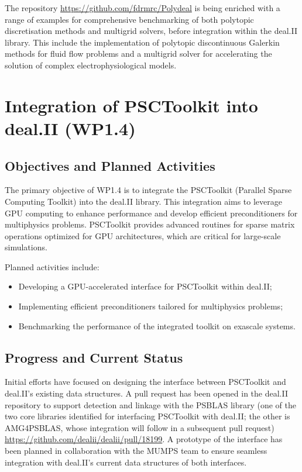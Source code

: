 \documentclass[a4paper,12pt]{article}
\begin{document}
The repository \url{https://github.com/fdrmrc/Polydeal} is being enriched with a range of examples for comprehensive benchmarking of both polytopic discretisation methods and multigrid solvers, before integration within the deal.II library. This include the implementation of polytopic discontinuous Galerkin methods for fluid flow problems and a multigrid solver for accelerating the solution of complex electrophysiological models.

\section{Integration of PSCToolkit into deal.II (WP1.4)}
    \subsection{Objectives and Planned Activities}
        The primary objective of WP1.4 is to integrate the PSCToolkit (Parallel Sparse Computing Toolkit) into the deal.II library. This integration aims to leverage GPU computing to enhance performance and develop efficient preconditioners for multiphysics problems. PSCToolkit provides advanced routines for sparse matrix operations optimized for GPU architectures, which are critical for large-scale simulations.

        Planned activities include:
        \begin{itemize}
            \item Developing a GPU-accelerated interface for PSCToolkit within deal.II;
            \item Implementing efficient preconditioners tailored for multiphysics problems;
            \item Benchmarking the performance of the integrated toolkit on exascale systems.
        \end{itemize}

        \subsection{Progress and Current Status}
        Initial efforts have focused on designing the interface between PSCToolkit and deal.II's existing data structures. A pull request has been opened in the deal.II repository to support detection and linkage with the PSBLAS library (one of the two core libraries identified for interfacing PSCToolkit with deal.II; the other is AMG4PSBLAS, whose integration will follow in a subsequent pull request) \url{https://github.com/dealii/dealii/pull/18199}. A prototype of the interface has been planned in collaboration with the MUMPS team to ensure seamless integration with deal.II's current data structures of both interfaces.
\end{document}
